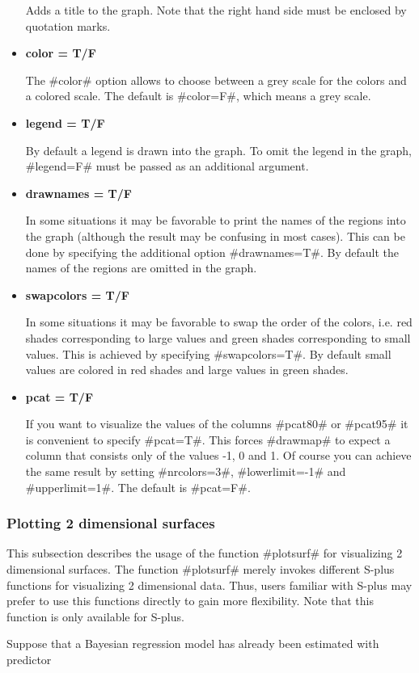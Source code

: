 \begin{itemize}
Adds a title to the graph. Note that the right hand side must be
enclosed by quotation marks.
\item {\bf color = T/F}

The #color# option allows to choose between a grey scale for the
colors and a colored scale. The default is #color=F#, which means
a grey scale. \item {\bf legend = T/F}

By default a legend is drawn into the graph. To omit the legend in
the graph, #legend=F# must be passed as an additional argument.
\item {\bf drawnames = T/F}

In some situations it may be favorable to print the names of the
regions into the graph (although the result may be confusing in
most cases). This can be done by specifying the additional option
#drawnames=T#. By default the names of the regions are omitted in
the graph. \item {\bf swapcolors = T/F}

In some situations it may be favorable to swap the order of the
colors, i.e. red shades corresponding to large values and green
shades corresponding to small values. This is achieved by
specifying #swapcolors=T#. By default small values are colored in
red shades and large values in green shades. \item {\bf pcat =
T/F}

If you want to visualize the values of the columns #pcat80# or
#pcat95# it is convenient to specify #pcat=T#. This forces
#drawmap# to expect a column that consists only of the values -1,
0 and 1. Of course you can achieve the same result by setting
#nrcolors=3#, #lowerlimit=-1# and #upperlimit=1#. The default is
#pcat=F#.
\end{itemize}

\subsubsection{Plotting 2 dimensional surfaces}

This subsection describes the usage of the function #plotsurf# for
visualizing 2 dimensional surfaces. The function #plotsurf# merely
invokes different S-plus functions for visualizing 2 dimensional
data. Thus, users familiar with S-plus may prefer to use this
functions directly to gain more flexibility. Note that this function
is only available for S-plus.

Suppose that a Bayesian regression model has already been
estimated with predictor

